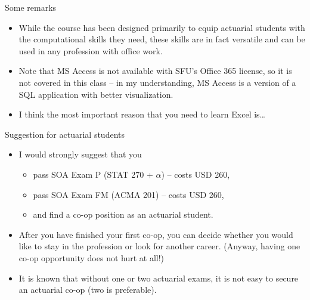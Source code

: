 \documentclass{beamer}
\begin{document}
\begin{frame}{Some remarks}
\begin{itemize}
  \item While the course has been designed primarily to equip actuarial students
        with the computational skills they need, these skills are in fact versatile
        and can be used in any profession with office work.
  \vspace{0.5em}
  \item Note that MS Access is not available with SFU's Office 365 license, so it
        is not covered in this class -- in my understanding, MS Access is a version
        of a SQL application with better visualization.
  \vspace{0.5em}
  \item I think the most important reason that you need to learn Excel is\ldots
\end{itemize}
\vspace{1em}
{\Large {}\par}
\end{frame}

\begin{frame}{Suggestion for actuarial students}
\begin{itemize}
  \item I would strongly suggest that you
  \begin{itemize}
    \item pass SOA Exam P (STAT 270 + $\alpha$) -- costs USD 260,
    \item pass SOA Exam FM (ACMA 201) -- costs USD 260,
    \item and find a co-op position as an actuarial student.
  \end{itemize}
  \vspace{0.5em}
  \item After you have finished your first co-op, you can decide whether you would
        like to stay in the profession or look for another career. (Anyway, having
        one co-op opportunity does not hurt at all!)
  \vspace{0.5em}
  \item It is known that without one or two actuarial exams, it is not easy to
        secure an actuarial co-op (two is preferable).
\end{itemize}
\end{frame}
\end{document}
